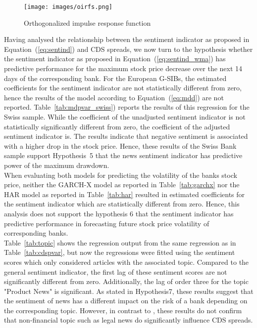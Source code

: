 \begin{figure}[H]
    \centering
    \texttt{[image: images/oirfs.png]}
    \caption{Orthogonalized impulse response function}
    \label{fig:oirfs}
\end{figure}


Having analysed the relationship between the sentiment indicator as proposed in \mbox{Equation~(\ref{eq:sentind})} and CDS spreads, we now turn to the hypothesis whether the sentiment indicator as proposed in \mbox{Equation~(\ref{eq:sentind_wma})} has predictive performance for the maximum stock price decrease over the next 14 days of the corresponding bank. For the European G-SIBs, the estimated coefficients for the sentiment indicator are not statistically different from zero, hence the results of the model according to \mbox{Equation~(\ref{eq:mdd})} are not reported. \mbox{Table~\ref{tab:mdpvar_swiss})} reports the results of this regression for the Swiss sample. While the coefficient of the unadjusted sentiment indicator is not statistically significantly different from zero, the coefficient of the adjusted sentiment indicator is. The results indicate that negative sentiment is associated with a higher drop in the stock price. Hence, these results of the Swiss Bank sample support \mbox{Hypothesis~5} that the news sentiment indicator has predictive power of the maximum drawdown. \\



When evaluating both models for predicting the volatility of the banks stock price, neither the GARCH-X model as reported in \mbox{Table~\ref{tab:garchx}} nor the HAR model as reported in \mbox{Table~\ref{tab:har}} resulted in estimated coefficients for the sentiment indicator which are statistically different from zero. Hence, this analysis does not support the hypothesis 6 that the sentiment indicator has predictive performance in forecasting future stock price volatility of corresponding banks. \\





\mbox{Table~\ref{tab:topic}} shows the regression output from the same regression as in \mbox{Table~\ref{tab:cdspvar}}, but now the regressions were fitted using the sentiment scores which only considered articles with the associated topic. Compared to the general sentiment indicator, the first lag of these sentiment scores are not significantly different from zero. Additionally, the lag of order three for the topic "Product News" is significant. As stated in \mbox{Hypothesis7}, these results suggest that the sentiment of news has a different impact on the risk of a bank depending on the corresponding topic. However, in contrast to \cite{roeder2020}, these results do not confirm that non-financial topic such as legal news do significantly influence CDS spreads.

